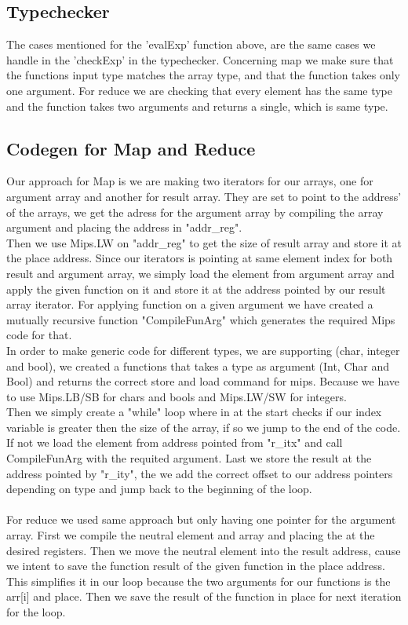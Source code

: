 \documentclass[12pt]{article}
\numberwithin{listing}{section}
\begin{document}
\subsection*{Typechecker}
The cases mentioned for the 'evalExp' function above, are the same cases we handle in the 'checkExp' in the typechecker. 
Concerning map we make sure that the functions input type matches the array type, and that the function takes only one argument. 
For reduce we are checking that every element has the same type and the function takes two arguments and returns a single, which is same type.


\subsection*{Codegen for Map and Reduce}
Our approach for Map is we are making two iterators for our arrays, one for argument array and another for result array. They are set to point to the address' of the arrays, we get the adress for the argument array by compiling the array argument and placing the address in "addr\_reg".
\\
Then we use Mips.LW on "addr\_reg" to get the size of result array and store it at the place address. Since our iterators is pointing at same element index for both result and argument array, we simply load the element from argument array and apply the given function on it and store it at the address pointed by our result array iterator. For applying function on a given argument we have created a mutually recursive function "CompileFunArg" which generates the required Mips code for that.\\
In order to make generic code for different types, we are supporting (char, integer and bool), we created a functions that takes a type as argument (Int, Char and Bool) and returns the correct store and load command for mips. Because we have to use Mips.LB/SB for chars and bools and Mips.LW/SW for integers.\\
Then we simply create a "while" loop where in at the start checks if our index variable is greater then the size of the array, if so we jump to the end of the code. If not we load the element from address pointed from "r\_itx" and call CompileFunArg with the requited argument. Last we store the result at the address pointed by "r\_ity", the we add the correct offset to our address pointers depending on type and jump back to the beginning of the loop. \\ \\
For reduce we used same approach but only having one pointer for the argument array. First we compile the neutral element and array and placing the at the desired registers. Then we move the neutral element into the result address, cause we intent to save the function result of the given function in the place address. This simplifies it in our loop because the two arguments for our functions is the arr[i] and place. Then we save the result of the function in place for next iteration for the loop.\\
\end{document}
